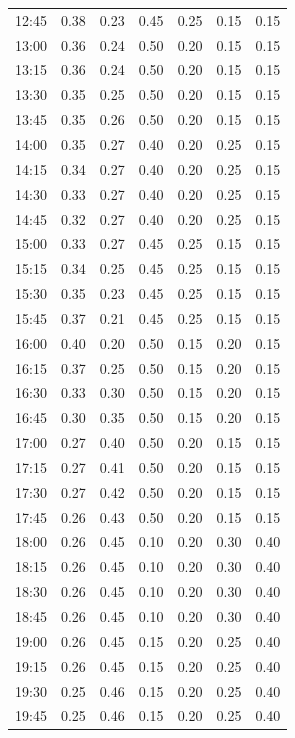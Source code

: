 \begin{longtable}{@{}lrrrrrr@{}}
12:45 & 0.38 & 0.23 & 0.45 & 0.25 & 0.15 & 0.15 \\
13:00 & 0.36 & 0.24 & 0.50 & 0.20 & 0.15 & 0.15 \\
13:15 & 0.36 & 0.24 & 0.50 & 0.20 & 0.15 & 0.15 \\
13:30 & 0.35 & 0.25 & 0.50 & 0.20 & 0.15 & 0.15 \\
13:45 & 0.35 & 0.26 & 0.50 & 0.20 & 0.15 & 0.15 \\
14:00 & 0.35 & 0.27 & 0.40 & 0.20 & 0.25 & 0.15 \\
14:15 & 0.34 & 0.27 & 0.40 & 0.20 & 0.25 & 0.15 \\
14:30 & 0.33 & 0.27 & 0.40 & 0.20 & 0.25 & 0.15 \\
14:45 & 0.32 & 0.27 & 0.40 & 0.20 & 0.25 & 0.15 \\
15:00 & 0.33 & 0.27 & 0.45 & 0.25 & 0.15 & 0.15 \\
15:15 & 0.34 & 0.25 & 0.45 & 0.25 & 0.15 & 0.15 \\
15:30 & 0.35 & 0.23 & 0.45 & 0.25 & 0.15 & 0.15 \\
15:45 & 0.37 & 0.21 & 0.45 & 0.25 & 0.15 & 0.15 \\
16:00 & 0.40 & 0.20 & 0.50 & 0.15 & 0.20 & 0.15 \\
16:15 & 0.37 & 0.25 & 0.50 & 0.15 & 0.20 & 0.15 \\
16:30 & 0.33 & 0.30 & 0.50 & 0.15 & 0.20 & 0.15 \\
16:45 & 0.30 & 0.35 & 0.50 & 0.15 & 0.20 & 0.15 \\
17:00 & 0.27 & 0.40 & 0.50 & 0.20 & 0.15 & 0.15 \\
17:15 & 0.27 & 0.41 & 0.50 & 0.20 & 0.15 & 0.15 \\
17:30 & 0.27 & 0.42 & 0.50 & 0.20 & 0.15 & 0.15 \\
17:45 & 0.26 & 0.43 & 0.50 & 0.20 & 0.15 & 0.15 \\
18:00 & 0.26 & 0.45 & 0.10 & 0.20 & 0.30 & 0.40 \\
18:15 & 0.26 & 0.45 & 0.10 & 0.20 & 0.30 & 0.40 \\
18:30 & 0.26 & 0.45 & 0.10 & 0.20 & 0.30 & 0.40 \\
18:45 & 0.26 & 0.45 & 0.10 & 0.20 & 0.30 & 0.40 \\
19:00 & 0.26 & 0.45 & 0.15 & 0.20 & 0.25 & 0.40 \\
19:15 & 0.26 & 0.45 & 0.15 & 0.20 & 0.25 & 0.40 \\
19:30 & 0.25 & 0.46 & 0.15 & 0.20 & 0.25 & 0.40 \\
19:45 & 0.25 & 0.46 & 0.15 & 0.20 & 0.25 & 0.40 \\

\end{longtable}
